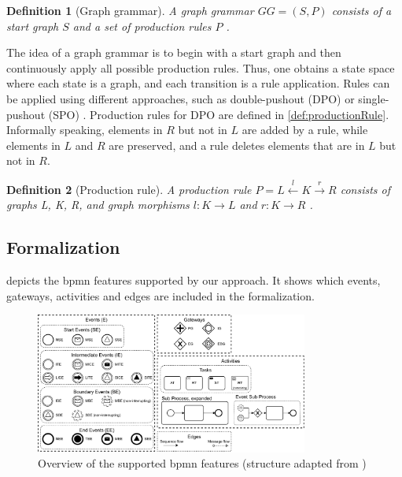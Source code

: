 \documentclass[adraft, copyright, creativecommons]{eptcs} %
\newtheorem{definition}{Definition}
\begin{document}
\begin{definition}[Graph grammar] \label{def:graphGrammar}
A graph grammar $GG=(S, P)$ consists of a start graph $S$ and a set of production rules $P$ \cite{ehrigFundamentalsAlgebraicGraph2006}. 
\end{definition}

The idea of a graph grammar is to begin with a start graph and then continuously apply all possible production rules.
Thus, one obtains a state space where each state is a graph, and each transition is a rule application.
Rules can be applied using different approaches, such as double-pushout (DPO) \cite{ehrigFundamentalsAlgebraicGraph2006} or single-pushout (SPO) \cite{loweAlgebraicApproachSinglepushout1993}.
Production rules for DPO are defined in \autoref{def:productionRule}.
Informally speaking, elements in $R$ but not in $L$ are added by a rule, while elements in $L$ and $R$ are preserved, and a rule deletes elements that are in $L$ but not in $R$.

\begin{definition}[Production rule] \label{def:productionRule}
A production rule $P= L \overset{l}{\leftarrow} K \overset{r}{\to} R$ consists of graphs L, K, R, and graph morphisms $l: K \to L$ and $r: K \to R$ \cite{ehrigFundamentalsAlgebraicGraph2006}.
\end{definition}




\subsection{Formalization}

 depicts the \gls*{bpmn} features supported by our approach.
It shows which events, gateways, activities and edges are included in the formalization.


\begin{figure}[h]
    \centering
    \includegraphics[width=0.8\textwidth]{images/bpmn_semantics-feature_overview.pdf}
    \caption{Overview of the supported \gls*{bpmn} features (structure adapted from \cite{houhouFirstOrderLogicVerification2022})}
    \label{fig:bpmnfeaturesOverview}
\end{figure}
\end{document}
